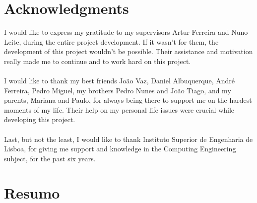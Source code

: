 \chapter*{Acknowledgments}

I would like to express my gratitude to my supervisors Artur Ferreira and Nuno Leite, during the entire project development. If it wasn't for them, the development of this project wouldn't be possible. Their assistance and motivation really made me to continue and to work hard on this project.\\
\\
I would like to thank my best friends João Vaz, Daniel Albuquerque, André Ferreira, Pedro Miguel, my brothers Pedro Nunes and João Tiago, and my parents, Mariana and Paulo, for always being there to support me on the hardest moments of my life. Their help on my personal life issues were crucial while developing this project.\\
\\
Last, but not the least, I would like to thank Instituto Superior de Engenharia de Lisboa, for giving me support and knowledge in the Computing Engineering subject, for the past six years.
\
\chapter*{Resumo}

